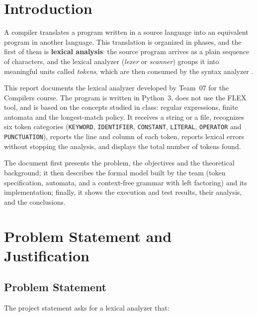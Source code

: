 \documentclass[11pt,letterpaper]{article}
\newcommand{\tok}[1]{\texttt{#1}}
\begin{document}
\enlargethispage{3\baselineskip}
\tableofcontents
\newpage

\section{Introduction}

A compiler translates a program written in a source language into an
equivalent program in another language. This translation is organized in
phases, and the first of them is \textbf{lexical analysis}: the source program
arrives as a plain sequence of characters, and the lexical analyzer
(\emph{lexer} or \emph{scanner}) groups it into meaningful units called
\emph{tokens}, which are then consumed by the syntax analyzer \cite{aho2006}.

This report documents the lexical analyzer developed by Team~07 for the
Compilers course. The program is written in Python~3, does not use the FLEX
tool, and is based on the concepts studied in class: regular expressions,
finite automata and the longest-match policy. It receives a string or a file,
recognizes six token categories (\tok{KEYWORD}, \tok{IDENTIFIER},
\tok{CONSTANT}, \tok{LITERAL}, \tok{OPERATOR} and \tok{PUNCTUATION}), reports
the line and column of each token, reports lexical errors without stopping
the analysis, and displays the total number of tokens found.

The document first presents the problem, the objectives and the theoretical
background; it then describes the formal model built by the team (token
specification, automata, and a context-free grammar with left factoring) and
its implementation; finally, it shows the execution and test results, their
analysis, and the conclusions.

\section{Problem Statement and Justification}

\subsection{Problem Statement}

The project statement \cite{lexerpdf} asks for a lexical analyzer that:
\end{document}
